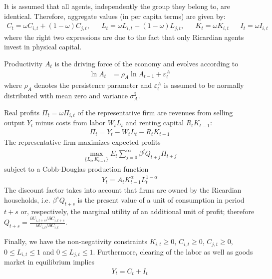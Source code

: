 \documentclass{article}
\begin{document}
It is assumed that all agents, independently the group they belong to, are identical. Therefore, aggregate values (in per capita terms) are given by:
\begin{align*}
	C_t = \omega C_{i,t} + (1-\omega)C_{j,t}, && 		L_t = \omega L_{i,t} + (1-\omega)L_{j,t}, && K_t = \omega K_{i,t} &&	I_t = \omega I_{i,t}
\end{align*}
where the right two expressions are due to the fact that only Ricardian agents invest in physical capital.

Productivity $A_t$ is the driving force of the economy and evolves according to
\begin{align*}
\ln{A_{t}} &= \rho_A \ln{A_{t-1}}  + \varepsilon_t^A
\end{align*}
where $\rho_A$ denotes the persistence parameter and $\varepsilon_t^A$ is assumed to be normally distributed with mean zero and variance $\sigma_A^2$.

Real profits $\Pi_t = \omega \Pi_{i,t}$ of the representative firm are revenues from selling output $Y_t$ minus costs from labor $W_t L_t$ and renting capital $R_t K_{t-1}$:
\begin{align*}
\Pi_t = Y_{t} - W_{t} L_{t} - R_{t} K_{t-1}
\end{align*}	
The representative firm maximizes expected profits
\begin{align*}
\underset{\{L_{t},K_{t-1}\}}{\max} E_t \sum_{j=0}^{\infty} \beta^j Q_{t+j}\Pi_{t+j}
\end{align*}
subject to a Cobb-Douglas production function
\begin{align*}
Y_t = A_t K_{t-1}^\alpha L_t^{1-\alpha}
\end{align*}
The discount factor takes into account that firms are owned by the Ricardian households, i.e. $\beta^s Q_{t+s}$ is the present value of a unit of consumption in period $t+s$ or, respectively, the marginal utility of an additional unit of profit; therefore $Q_{t+s}=\frac{\partial U_{i,t+s}/\partial C_{i,t+s}}{\partial U_{i,t}/\partial C_{i,t}}$.

Finally, we have the non-negativity constraints	$K_{i,t} \geq0$, $C_{i,t} \geq 0$, $C_{j,t} \geq 0$, $0\leq L_{i,t} \leq 1$ and $0\leq L_{j,t} \leq 1$. Furthermore, clearing of the labor as well as goods market in equilibrium implies
\begin{align*}
Y_t = C_t + I_t
\end{align*}
\end{document}
